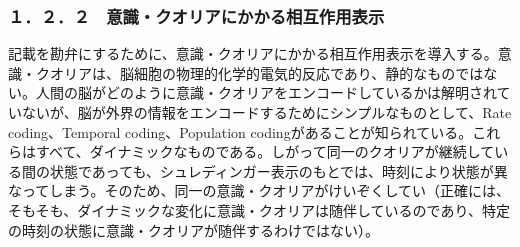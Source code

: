\subsubsection{１．２．２　意識・クオリアにかかる相互作用表示}
記載を勘弁にするために、意識・クオリアにかかる相互作用表示を導入する。意識・クオリアは、脳細胞の物理的化学的電気的反応であり、静的なものではない。人間の脳がどのように意識・クオリアをエンコードしているかは解明されていないが、脳が外界の情報をエンコードするためにシンプルなものとして、Rate coding、Temporal coding、Population codingがあることが知られている\cite{wikipediac}。これらはすべて、ダイナミックなものである。しがって同一のクオリアが継続している間の状態であっても、シュレディンガー表示のもとでは、時刻により状態が異なってしまう。そのため、同一の意識・クオリアがけいぞくしてい（正確には、そもそも、ダイナミックな変化に意識・クオリアは随伴しているのであり、特定の時刻の状態に意識・クオリアが随伴するわけではない）。

